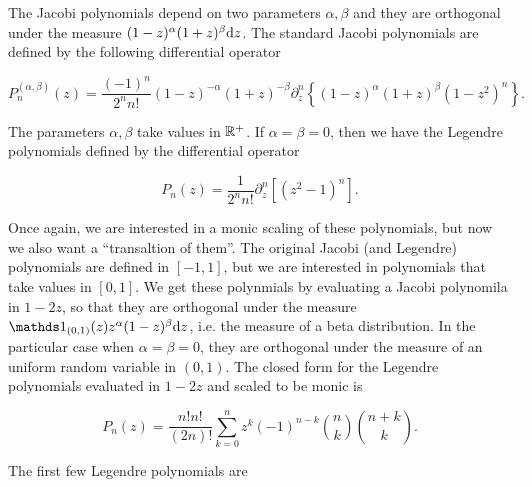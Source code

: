     The Jacobi polynomials depend on two parameters $\alpha,\beta$ and they are orthogonal under the measure $(1-z)^{\alpha}(1+z)^{\beta}\mathrm d z$. The standard Jacobi polynomials are defined by the following differential operator

    \begin{equation*}
        P_{n}^{(\alpha ,\beta )}(z) = \frac{(-1)^{n}}{2^{n}n!}(1-z)^{-\alpha }(1+z)^{-\beta }\partial_z^n \left\{(1-z)^{\alpha }(1+z)^{\beta }\left(1-z^{2}\right)^{n}\right\}.
    \end{equation*}

    The parameters $\alpha,\beta$ take values in $\mathbb R^+$. If $\alpha = \beta = 0$, then we have the Legendre polynomials defined by the differential operator

    \begin{equation*}
        P_{n}(z) = \frac{1}{2^{n}n!}\partial_z^n [(z^{2}-1)^{n}].
    \end{equation*}

    Once again, we are interested in a monic scaling of these polynomials, but now we also want a ``transaltion of them''. The original Jacobi (and Legendre) polynomials are defined in $[-1,1]$, but we are interested in polynomials that take values in $[0,1]$. We get these polynmials by evaluating a Jacobi polynomila in $1-2z$, so that they are orthogonal under the measure $\mathds 1_{(0,1)}(z)z^\alpha(1-z)^\beta \d z$, i.e. the measure of a beta distribution. In the particular case when $\alpha = \beta = 0$, they are orthogonal under the measure of an uniform random variable in $(0,1)$. The closed form for the Legendre polynomials evaluated in $1-2z$ and scaled to be monic is

    \begin{equation*}
        P_n(z) =\frac{n!n!}{(2n)!}\sum_{k=0}^n z^k(-1)^{n-k} \binom nk \binom{n+k}k.
    \end{equation*}

    The first few Legendre polynomials are

